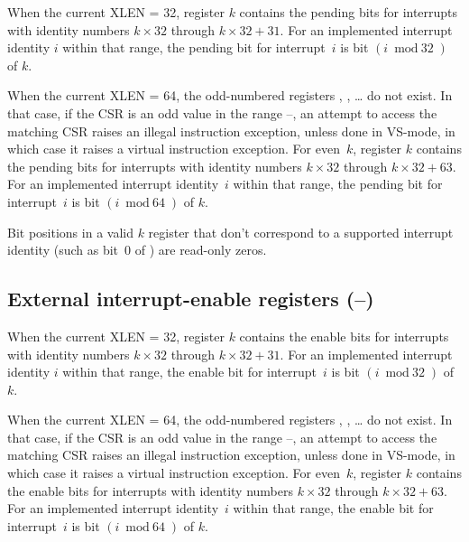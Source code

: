 When the current XLEN = 32, register $k$
contains the pending bits for interrupts with identity numbers
$k\times\mbox{32}$ through ${k\times\mbox{32} + \mbox{31}}$.
For an implemented interrupt identity $i$ within that range, the
pending bit for interrupt~$i$ is bit $(i\bmod\mbox{32})$ of $k$.

When the current XLEN = 64, the odd-numbered
registers , , \dots {} do not exist.
In that case, if the  CSR is an odd value in the range
--, an attempt to access the matching  CSR
raises an illegal instruction exception, unless done in VS-mode, in
which case it raises a virtual instruction exception.
For even~$k$, register $k$ contains the pending bits
for interrupts with identity numbers $k\times\mbox{32}$ through
${k\times\mbox{32} + \mbox{63}}$.
For an implemented interrupt identity~$i$ within that range, the
pending bit for interrupt~$i$ is bit $(i\bmod\mbox{64})$ of $k$.

Bit positions in a valid $k$ register that don't correspond
to a supported interrupt identity (such as bit~0 of ) are
read-only zeros.

\subsection{External interrupt-enable registers (--)}

When the current XLEN = 32, register $k$
contains the enable bits for interrupts with identity numbers
$k\times\mbox{32}$ through ${k\times\mbox{32} + \mbox{31}}$.
For an implemented interrupt identity $i$ within that range, the enable
bit for interrupt~$i$ is bit $(i\bmod\mbox{32})$ of $k$.

When the current XLEN = 64, the odd-numbered
registers , , \dots {} do not exist.
In that case, if the  CSR is an odd value in the range
--, an attempt to access the matching  CSR
raises an illegal instruction exception, unless done in VS-mode, in
which case it raises a virtual instruction exception.
For even~$k$, register $k$ contains the enable bits for
interrupts with identity numbers $k\times\mbox{32}$ through
${k\times\mbox{32} + \mbox{63}}$.
For an implemented interrupt identity~$i$ within that range, the enable
bit for interrupt~$i$ is bit $(i\bmod\mbox{64})$ of $k$.

